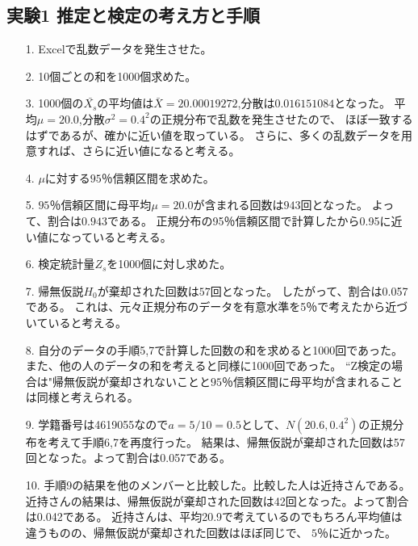 \documentclass[12pt]{jarticle}
\begin{document}
\subsection{実験1 推定と検定の考え方と手順}
\begin{itemize}
      \item [1.]Excelで乱数データを発生させた。
      \item [2.]10個ごとの和を1000個求めた。
      \item [3.]1000個の$\bar{X_s}$の平均値は$\bar{X}=20.00019272$,分散は$0.016151084$となった。
            平均$\mu=20.0$,分散$\sigma^2=0.4^2$の正規分布で乱数を発生させたので、
            ほぼ一致するはずであるが、確かに近い値を取っている。
            さらに、多くの乱数データを用意すれば、さらに近い値になると考える。

      \item [4.]$\mu$に対する$95％$信頼区間を求めた。

      \item [5.]$95％$信頼区間に母平均$\mu=20.0$が含まれる回数は$943$回となった。
            よって、割合は$0.943$である。
            正規分布の95％信頼区間で計算したから0.95に近い値になっていると考える。
      \item [6.]検定統計量$Z_s$を1000個に対し求めた。
      \item [7.]帰無仮説$H_0$が棄却された回数は$57$回となった。
            したがって、割合は0.057である。
            これは、元々正規分布のデータを有意水準を5％で考えたから近づいていると考える。
      \item [8.]自分のデータの手順5,7で計算した回数の和を求めると1000回であった。
            また、他の人のデータの和を考えると同様に1000回であった。
            ``Z検定の場合は"帰無仮説が棄却されないことと$95％$信頼区間に母平均が含まれることは同様と考えられる。

      \item [9.]学籍番号は4619055なので$a=5/10=0.5$として、$N(20.6,0.4^2)$の正規分布を考えて手順6,7を再度行った。
            結果は、帰無仮説が棄却された回数は57回となった。よって割合は0.057である。
      \item [10.]手順9の結果を他のメンバーと比較した。比較した人は近持さんである。
            近持さんの結果は、帰無仮説が棄却された回数は42回となった。よって割合は0.042である。
            近持さんは、平均20.9で考えているのでもちろん平均値は違うものの、帰無仮説が棄却された回数はほぼ同じで、
            $5％$に近かった。
\end{itemize}
\end{document}
